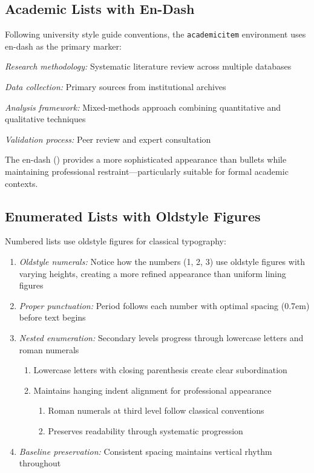 \documentclass[11pt]{article}
\begin{document}
\subsection{Academic Lists with En-Dash}

Following university style guide conventions, the \texttt{academicitem} environment uses en-dash as the primary marker:

\begin{academicitem}
\item \emph{Research methodology:} Systematic literature review across multiple databases
\item \emph{Data collection:} Primary sources from institutional archives
\item \emph{Analysis framework:} Mixed-methods approach combining quantitative and qualitative techniques
\item \emph{Validation process:} Peer review and expert consultation
\end{academicitem}

The en-dash (\textendash) provides a more sophisticated appearance than bullets while maintaining professional restraint—particularly suitable for formal academic contexts.

\subsection{Enumerated Lists with Oldstyle Figures}

Numbered lists use oldstyle figures for classical typography:

\begin{enumerate}
\item \emph{Oldstyle numerals:} Notice how the numbers (1, 2, 3) use oldstyle figures with varying heights, creating a more refined appearance than uniform lining figures
\item \emph{Proper punctuation:} Period follows each number with optimal spacing (0.7em) before text begins
\item \emph{Nested enumeration:} Secondary levels progress through lowercase letters and roman numerals
  \begin{enumerate}
  \item Lowercase letters with closing parenthesis create clear subordination
  \item Maintains hanging indent alignment for professional appearance
    \begin{enumerate}
    \item Roman numerals at third level follow classical conventions
    \item Preserves readability through systematic progression
    \end{enumerate}
  \end{enumerate}
\item \emph{Baseline preservation:} Consistent spacing maintains vertical rhythm throughout
\end{enumerate}
\end{document}
